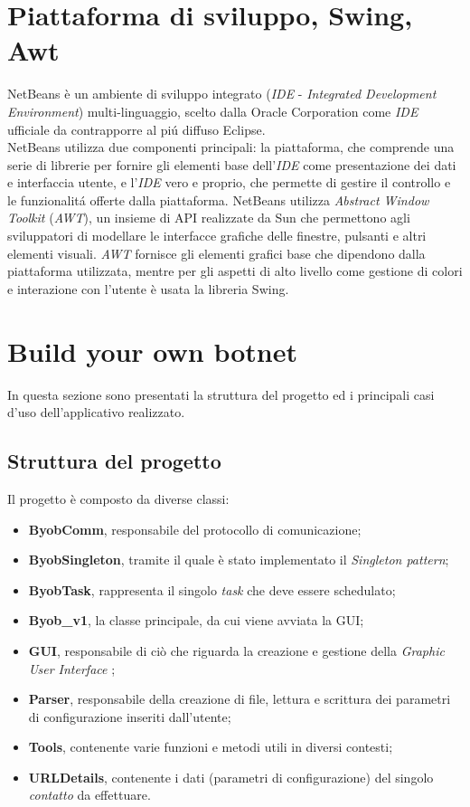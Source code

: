 \section{Piattaforma di sviluppo, Swing, Awt}
NetBeans \`e un ambiente di sviluppo integrato (\textit{IDE} -  \textit{Integrated Development Environment}) multi-linguaggio, scelto dalla Oracle Corporation come \textit{IDE} ufficiale da contrapporre al pi\'u diffuso Eclipse.\\
NetBeans utilizza due componenti principali: la piattaforma, che comprende una serie di librerie per fornire gli elementi base dell'\textit{IDE} come presentazione dei dati e interfaccia utente, e l'\textit{IDE} vero e proprio, che permette di gestire il controllo e le funzionalit\'a offerte dalla piattaforma. NetBeans utilizza \textit{Abstract Window Toolkit} (\textit{AWT}), un insieme di API realizzate da Sun che permettono agli sviluppatori di modellare le interfacce grafiche delle finestre, pulsanti e altri elementi visuali. \textit{AWT} fornisce gli elementi grafici base che dipendono dalla piattaforma utilizzata, mentre per gli aspetti di alto livello come gestione di colori e interazione con l'utente \`e usata la libreria Swing.

\vspace*{1cm}
\section{Build your own botnet}
In questa sezione sono presentati la struttura del progetto ed i principali casi d'uso dell'applicativo realizzato.

\vspace*{0.5cm}
\subsection{Struttura del progetto}
Il progetto \`e composto da diverse classi:
\begin{itemize}
\item \textbf{ByobComm}, responsabile del protocollo di comunicazione;
\item \textbf{ByobSingleton}, tramite il quale \`{e} stato implementato il \textit{Singleton pattern};
\item \textbf{ByobTask}, rappresenta il singolo \textit{task} che deve essere schedulato;
\item \textbf{Byob\_v1}, la classe principale, da cui viene avviata la GUI;
\item \textbf{GUI}, responsabile di ci\`{o} che riguarda la creazione e gestione della \textit{Graphic User Interface} ;
\item \textbf{Parser}, responsabile della creazione di file, lettura e scrittura dei parametri di configurazione inseriti dall'utente;
\item \textbf{Tools}, contenente varie funzioni e metodi utili in diversi contesti;
\item \textbf{URLDetails}, contenente i dati (parametri di configurazione) del singolo \textit{contatto} da effettuare.
\end{itemize} 

